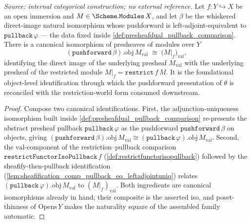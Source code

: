 \begin{definition}\leanok
  \label{def:pushforward_obj_val_restrict_iso}
  \textit{Source: internal categorical construction; no external reference.}
  Let \(f : Y \hookrightarrow X\) be an open immersion and \(M \in \Scheme.\mathtt{Modules}\,X\), and let
  \(\beta\) be the whiskered direct-image natural isomorphism whose pushforward is
  left-adjoint-equivalent to \(\mathtt{pullback}\,\varphi\) --- the data fixed inside
  \cref{def:presheafdual_pullback_comparison}. There is a canonical isomorphism of presheaves of modules
  over \(Y\)
  \[
    (\mathtt{pushforward}\,\beta).\mathrm{obj}\,M_{\mathrm{val}}
      \;\cong\; \bigl(M|_f\bigr)_{\mathrm{val}},
  \]
  identifying the direct image of the underlying presheaf \(M_{\mathrm{val}}\) with the underlying
  presheaf of the restricted module \(M|_f = \mathtt{restrict}\,f\,M\). It is the foundational
  object-level identification through which the pushforward presentation of \(\theta\) is reconciled with
  the restriction-world form consumed downstream.
\end{definition}
\begin{proof}
  \leanok
  Compose two canonical identifications. First, the adjunction-uniqueness isomorphism built inside
  \cref{def:presheafdual_pullback_comparison} re-presents the abstract presheaf pullback
  \(\mathtt{pullback}\,\varphi\) as the pushforward \(\mathtt{pushforward}\,\beta\) on objects, giving
  \((\mathtt{pushforward}\,\beta).\mathrm{obj}\,M_{\mathrm{val}} \cong
  (\mathtt{pullback}\,\varphi).\mathrm{obj}\,M_{\mathrm{val}}\). Second, the \(\mathrm{val}\)-component of
  the restriction--pullback comparison \(\mathtt{restrictFunctorIsoPullback}\,f\)
  (\cref{def:restrictfunctorisopullback}) followed by the sheafify-then-pullback identification
  (\cref{lem:sheafification_comp_pullback_eq_leftadjointuniq}) relates
  \((\mathtt{pullback}\,\varphi).\mathrm{obj}\,M_{\mathrm{val}}\) to \((M|_f)_{\mathrm{val}}\). Both
  ingredients are canonical isomorphisms already in hand; their composite is the asserted iso, and
  poset-thinness of \(\mathrm{Opens}\,Y\) makes the naturality square of the assembled family automatic.
\end{proof}

